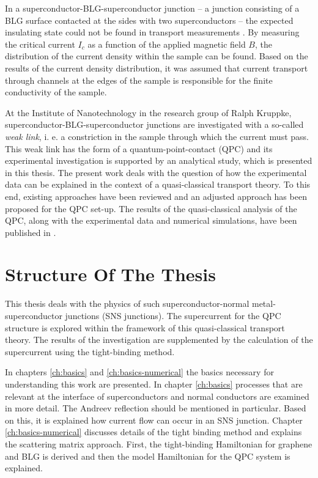 In a superconductor-BLG-superconductor junction -- a junction consisting of a BLG surface contacted at the sides with two superconductors -- the expected insulating state could not be found in transport measurements \cite{Zhu2017}. By measuring the critical current $I_c$ as a function of the applied magnetic field $B$, the distribution of the current density within the sample can be found. Based on the results of the current density distribution, it was assumed that current transport through channels at the edges of the sample is responsible for the finite conductivity of the sample. 

At the Institute of Nanotechnology in the research group of Ralph Kruppke, superconductor-BLG-superconductor junctions are investigated with a so-called \emph{weak link}, i. e. a constriction in the sample through which the current must pass. This weak link has the form of a quantum-point-contact (QPC) and its experimental investigation is supported by an analytical study, which is presented in this thesis. The present work deals with the question of how the experimental data can be explained in the context of a quasi-classical transport theory. To this end, existing approaches have been reviewed and an adjusted approach has been proposed for the QPC set-up. The results of the quasi-classical analysis of the QPC, along with the experimental data and numerical simulations, have been published in \cite{Kraft2017}.

\section*{Structure Of The Thesis}

This thesis deals with the physics of such superconductor-normal metal-superconductor junctions (SNS junctions). The supercurrent for the QPC structure is explored within the framework of this quasi-classical transport theory. The results of the investigation are supplemented by the calculation of the supercurrent using the tight-binding method.

In chapters \ref{ch:basics} and \ref{ch:basics-numerical} the basics necessary for understanding this work are presented. In chapter \ref{ch:basics} processes that are relevant at the interface of superconductors and normal conductors are examined in more detail. The Andreev reflection should be mentioned in particular. Based on this, it is explained how current flow can occur in an SNS junction. Chapter \ref{ch:basics-numerical} discusses details of the tight binding method and explains the scattering matrix approach. First, the tight-binding Hamiltonian for graphene and BLG is derived and then the model Hamiltonian for the QPC system is explained. 

